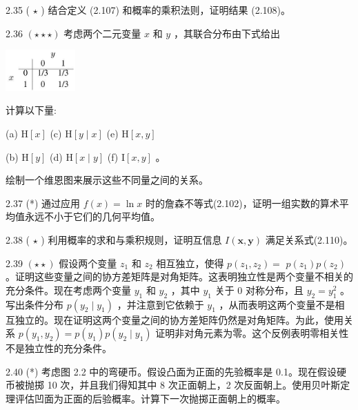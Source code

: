 \documentclass[10pt]{report}
\begin{document}
2.35 ( \(\star\) ) 结合定义 (2.107) 和概率的乘积法则，证明结果 (2.108)。

2.36 \(\left( {\star  \star   \star  }\right)\) 考虑两个二元变量 \(x\) 和 \(y\) ，其联合分布由下式给出

\begin{center}
\includegraphics[max width=0.2\textwidth]{images/0194e279-9b28-703a-88f4-c3ac21e2010d_81_880_872_262_155_0.jpg}
\end{center}
\hspace*{3em} 

计算以下量:

(a) \(\mathrm{H}\left\lbrack  x\right\rbrack\) (c) \(\mathrm{H}\left\lbrack  {y \mid  x}\right\rbrack\) (e) \(\mathrm{H}\left\lbrack  {x,y}\right\rbrack\)

(b) \(\mathrm{H}\left\lbrack  y\right\rbrack\) (d) \(\mathrm{H}\left\lbrack  {x \mid  y}\right\rbrack\) (f) \(\mathrm{I}\left\lbrack  {x,y}\right\rbrack\) 。

绘制一个维恩图来展示这些不同量之间的关系。

2.37 (*) 通过应用 \(f\left( x\right)  = \ln x\) 时的詹森不等式(2.102)，证明一组实数的算术平均值永远不小于它们的几何平均值。

2.38 ( \(\star\) ) 利用概率的求和与乘积规则，证明互信息 \(I\left( {\mathbf{x},\mathbf{y}}\right)\) 满足关系式(2.110)。

2.39 \(\left( {\star  \star  }\right)\) 假设两个变量 \({z}_{1}\) 和 \({z}_{2}\) 相互独立，使得 \(p\left( {{z}_{1},{z}_{2}}\right)  =\)  \(p\left( {z}_{1}\right) p\left( {z}_{2}\right)\) 。证明这些变量之间的协方差矩阵是对角矩阵。这表明独立性是两个变量不相关的充分条件。现在考虑两个变量 \({y}_{1}\) 和 \({y}_{2}\) ，其中 \({y}_{1}\) 关于 0 对称分布，且 \({y}_{2} = {y}_{1}^{2}\) 。写出条件分布 \(p\left( {{y}_{2} \mid  {y}_{1}}\right)\) ，并注意到它依赖于 \({y}_{1}\) ，从而表明这两个变量不是相互独立的。现在证明这两个变量之间的协方差矩阵仍然是对角矩阵。为此，使用关系 \(p\left( {{y}_{1},{y}_{2}}\right)  = p\left( {y}_{1}\right) p\left( {{y}_{2} \mid  {y}_{1}}\right)\) 证明非对角元素为零。这个反例表明零相关性不是独立性的充分条件。

2.40 (*) 考虑图 2.2 中的弯硬币。假设凸面为正面的先验概率是 0.1。现在假设硬币被抛掷 10 次，并且我们得知其中 8 次正面朝上，2 次反面朝上。使用贝叶斯定理评估凹面为正面的后验概率。计算下一次抛掷正面朝上的概率。
\end{document}
